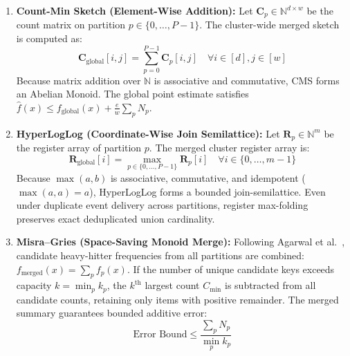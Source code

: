 \begin{enumerate}
 \item \textbf{Count-Min Sketch (Element-Wise Addition):}
 Let $\mathbf{C}_p \in \mathbb{N}^{d \times w}$ be the count matrix on partition $p \in \{0, \dots, P-1\}$. The cluster-wide merged sketch is computed as:
 \begin{equation}
        \mathbf{C}_{\text{global}}[i, j] = \sum_{p=0}^{P-1} \mathbf{C}_p[i, j] \quad \forall i \in [d], j \in [w]
    \end{equation}
 Because matrix addition over $\mathbb{N}$ is associative and commutative, CMS forms an Abelian Monoid. The global point estimate satisfies $\hat{f}(x) \le f_{\text{global}}(x) + \frac{e}{w} \sum_p N_p$.

 \item \textbf{HyperLogLog (Coordinate-Wise Join Semilattice):}
 Let $\mathbf{R}_p \in \mathbb{N}^m$ be the register array of partition $p$. The merged cluster register array is:
 \begin{equation}
        \mathbf{R}_{\text{global}}[i] = \max_{p \in \{0, \dots, P-1\}} \mathbf{R}_p[i] \quad \forall i \in \{0, \dots, m-1\}
    \end{equation}
 Because $\max(a, b)$ is associative, commutative, and idempotent ($\max(a, a) = a$), HyperLogLog forms a bounded join-semilattice. Even under duplicate event delivery across partitions, register max-folding preserves exact deduplicated union cardinality.

 \item \textbf{Misra--Gries (Space-Saving Monoid Merge):}
 Following Agarwal et al.~\cite{agarwal2013mergeable}, candidate heavy-hitter frequencies from all partitions are combined: $f_{\text{merged}}(x) = \sum_p f_p(x)$. If the number of unique candidate keys exceeds capacity $k = \min_p k_p$, the $k^{\text{th}}$ largest count $C_{\min}$ is subtracted from all candidate counts, retaining only items with positive remainder. The merged summary guarantees bounded additive error:
 \begin{equation}
        \text{Error Bound} \le \frac{\sum_p N_p}{\min_p k_p}
    \end{equation}
\end{enumerate}

